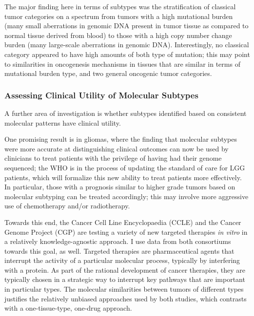         The major finding here in terms of subtypes was the stratification of
        classical tumor categories on a spectrum from tumors with a high
        mutational burden (many small aberrations in genomic DNA present in
        tumor tissue as compared to normal tissue derived from blood) to those
        with a high copy number change burden (many large-scale aberrations in
        genomic DNA). Interestingly, no classical category appeared to have
        high amounts of both type of mutation; this may point to similarities
        in oncogenesis mechanisms in tissues that are similar in terms of
        mutational burden type, and two general oncogenic tumor
        categories.
        
        \subsubsection{Assessing Clinical Utility of Molecular Subtypes}

        A further area of investigation is whether subtypes identified
        based on consistent molecular patterns have clinical utility.

        
        One promising result is in gliomas, where the finding that molecular subtypes were more
        accurate at distinguishing clinical outcomes can now be used by
        clinicians to treat patients with the privilege of having had
        their genome sequenced; the WHO is in the process of updating
        the standard of care for LGG patients, which will formalize
        this new ability to treat patients more effectively. In
        particular, those with a prognosis similar to higher grade
      tumors based on molecular subtyping can be treated
        accordingly; this may involve more aggressive use of
        chemotherapy and/or radiotherapy.

        Towards this end, the Cancer Cell Line
        Encyclopaedia (CCLE)\cite{barretina_cancer_2012} and the Cancer
        Genome Project (CGP)  are testing a variety
        of new targeted therapies \textit{in vitro} in a relatively knowledge-agnostic
        approach. I use data from both consortiums towards this goal,
        as well. Targeted therapies are pharmaceutical agents that
        interrupt the activity of a particular molecular process,
        typically by interfering with a protein. As part of the
        rational development of cancer therapies, they are typically
        chosen in a strategic way to interrupt key pathways that are
        important in particular types. The molecular similarities
        between tumors of different types justifies the relatively
        unbiased approaches used by both studies, which contrasts with
        a one-tissue-type, one-drug approach.
        
